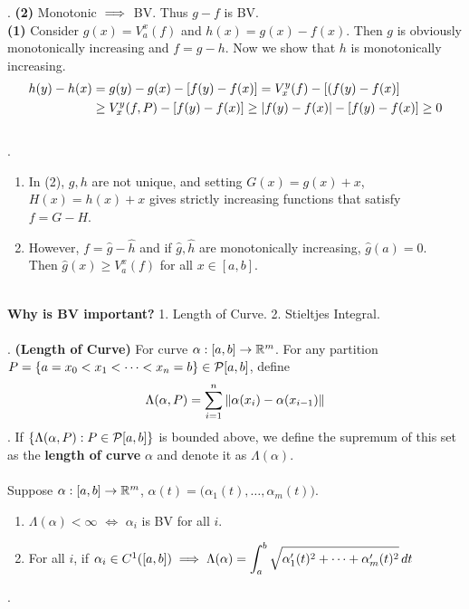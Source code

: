\pf. \textbf{(2)} Monotonic $\implies$ BV. Thus $g-f$ is BV.\\
\textbf{(1)} Consider $g(x) = V_a^x(f)$ and $h(x) = g(x) - f(x)$. Then $g$ is obviously monotonically increasing and $f = g-h$. Now we show that $h$ is monotonically increasing.
$$\begin{aligned}
h(y) - h(x) &= g(y) - g(x) - [f(y) - f(x)] = V_x^y(f) -[(f(y) - f(x)] \\&\geq V_x^y(f, P) - [f(y) - f(x)] \geq \left|f(y) -f(x)\right| - [f(y)-f(x)]\geq 0
\end{aligned}$$\\
\rmk.
\begin{enumerate}
	\item In (2), $g, h$ are not unique, and setting $G(x) = g(x) + x$, $H(x) = h(x) + x$ gives strictly increasing functions that satisfy $f = G-H$.
	\item However, $f = \widehat{g} - \widehat{h}$ and if $\widehat{g}, \widehat{h}$ are monotonically increasing, $\widehat{g}(a) = 0$. \\
	Then $\widehat{g}(x)\geq V_a^x(f)$ for all $x\in [a, b]$.
\end{enumerate}~\\
\textbf{Why is BV important?} 1. Length of Curve. 2. Stieltjes Integral.\\
\\
. \textbf{(Length of Curve)} For curve $\alpha: [a, b]\rightarrow \mathbb{R}^m$. For any partition
$P = \{a = x_0 < x_1 < \cdots < x_n = b\} \in \mathcal{P}[a, b]$, define
$$\Lambda(\alpha, P) = \sum_{i=1}^n\left\lVert\alpha(x_i) - \alpha(x_{i-1})\right\rVert$$
. If $\{\Lambda(\alpha, P): P \in \mathcal{P}[a, b]\}$ is bounded above, we define the supremum of this set as the \textbf{length of curve} $\alpha$ and denote it as $\Lambda(\alpha)$.\\
\\
 Suppose $\alpha:[a, b]\rightarrow \mathbb{R}^m$, $\alpha(t) = \big(\alpha_1(t) , \dots, \alpha_m(t)\big)$.
\begin{enumerate}
	\item $\Lambda(\alpha)  < \infty$ $\iff$ $\alpha_i$ is BV for all $i$.
	\item For all $i$, if $\alpha_i \in C^1([a, b]) \implies \Lambda(\alpha) = \displaystyle\int_a^b \sqrt{\alpha'_1(t)^2 +\cdots +  \alpha'_m(t)^2} \,dt$
\end{enumerate}
\pf.

